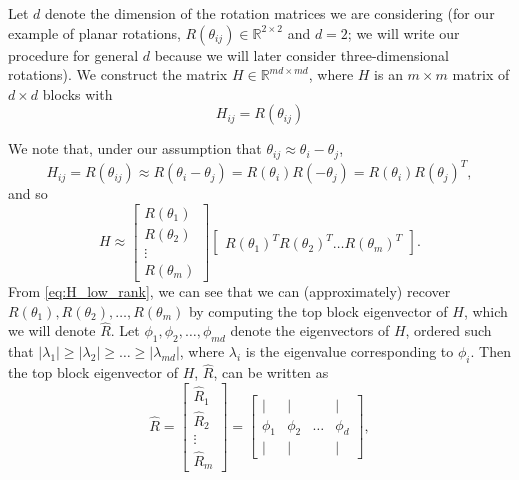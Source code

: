 \documentclass{pnastwo}
\begin{document}
\begin{article}
\begin{materials}
Let $d$ denote the dimension of the rotation matrices we are considering (for our example of planar rotations, $R(\theta_{ij}) \in \mathbb{R}^{2 \times 2}$ and $d=2$; we will write our procedure for general $d$ because we will later consider three-dimensional rotations).
%
We construct the matrix $H \in \mathbb{R}^{md \times md}$, where $H$ is an $m \times m$ matrix of $d \times d$ blocks with
\begin{equation} \label{eq:H_to_R}
H_{ij} = R(\theta_{ij})
\end{equation}
%

We note that, under our assumption that $\theta_{ij} \approx \theta_i - \theta_j$, 
\begin{equation} 
H_{ij} = R(\theta_{ij}) \approx R(\theta_i - \theta_j) = R(\theta_i) R(-\theta_j) = R(\theta_i) R(\theta_j)^T,
\end{equation}
 and so
\begin{equation} \label{eq:H_low_rank}
	H \approx 
	\begin{bmatrix}
	R(\theta_1) \\
	R(\theta_2) \\
	\vdots \\
	R(\theta_m)
	\end{bmatrix}
	\begin{bmatrix}
	R(\theta_1)^T R(\theta_2)^T \dots R(\theta_m)^T
	\end{bmatrix}.
\end{equation}
%
From \eqref{eq:H_low_rank}, we can see that we can (approximately) recover $R(\theta_1), R(\theta_2), \dots, R(\theta_m)$ by computing the top block eigenvector of $H$, which we will denote $\hat{R}$.
%
Let $\phi_1, \phi_2, \dots, \phi_{md}$ denote the eigenvectors of $H$, ordered such that $|\lambda_1| \ge |\lambda_2| \ge \dots \ge |\lambda_{md}|$, where $\lambda_i$ is the eigenvalue corresponding to $\phi_i$. 
%
Then the top block eigenvector of $H$, $\hat{R}$, can be written as
\begin{equation}
\hat{R} = 
\begin{bmatrix}
\hat{R}_1 \\
\hat{R}_2 \\
\vdots \\
\hat{R}_m
\end{bmatrix} =
\begin{bmatrix}
| & | & & | \\
\phi_1 & \phi_2 & \dots & \phi_d \\
| & | & & | 
\end{bmatrix},
\end{equation}

\end{materials}
\end{article}
\end{document}
